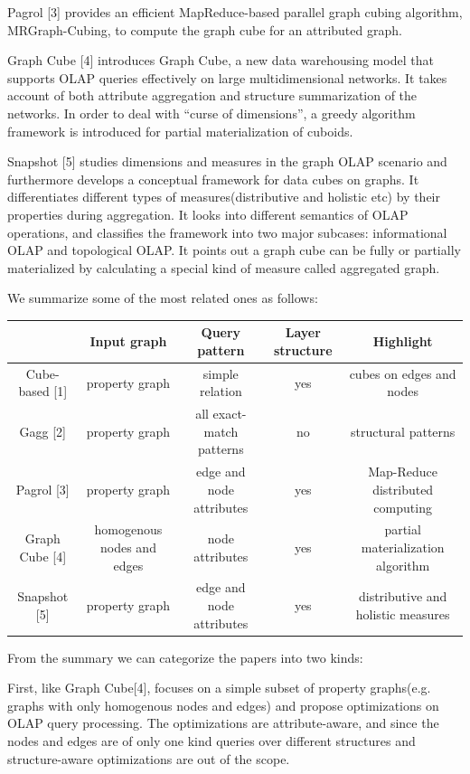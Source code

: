 Pagrol [3] provides an efficient MapReduce-based parallel graph
cubing algorithm, MRGraph-Cubing, to compute the graph cube
for an attributed graph. 

Graph Cube [4] introduces Graph Cube, a new data warehousing model that supports OLAP queries effectively on large multidimensional networks. It takes account of both attribute aggregation and structure summarization of the networks. In order to deal with “curse of dimensions”, a greedy algorithm framework is introduced for partial materialization of cuboids.

Snapshot [5] studies dimensions and measures in the graph OLAP scenario and furthermore develops a conceptual framework for data cubes on graphs. It differentiates different types of measures(distributive and holistic etc) by their properties during aggregation. It looks into different semantics of OLAP operations, and classifies the framework into two major subcases: informational OLAP and topological OLAP. It points out a graph cube can be fully or partially materialized by calculating a special kind of measure called aggregated graph. 


We summarize some of the most related ones as follows:
 
 \begin{center}
 	\begin{tabular}{ | c | c | c | c | c |  } 
 		\hline 
 		 & Input graph & Query pattern & Layer structure & Highlight\\ \hline Cube-based [1] & property graph & simple relation & yes & cubes on edges and nodes\\ \hline Gagg [2] & property graph & all exact-match patterns & no & structural patterns\\ \hline Pagrol [3] & property graph & edge and node attributes & yes & Map-Reduce distributed computing\\ \hline Graph Cube [4] & homogenous nodes and edges & node attributes & yes & partial materialization algorithm\\ \hline Snapshot [5] & property graph & edge and node attributes & yes & distributive and holistic measures\\ \hline 
 	\end{tabular}
 	\end {center}

 
 
From the summary we can categorize the papers into two kinds: 
 
First, like Graph Cube[4], focuses on a simple subset of property graphs(e.g. graphs with only homogenous nodes and edges) and propose optimizations on OLAP query processing. The optimizations are attribute-aware, and since the nodes and edges are of only one kind queries over different structures and structure-aware optimizations are out of the scope. 
 
